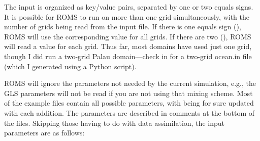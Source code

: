 The input is organized as key/value pairs, separated by one or two
equals signs. It is possible for ROMS to run on more than one grid
simultaneously, with the number of grids being read from the input
file. If there is one equals sign (\code{=}), ROMS will use the
corresponding value for all grids. If there are two (\code{==}), ROMS
will read a value for each grid. Thus far, most domains have used just
one grid, though I did run a two-grid Palau domain---check in
 for a two-grid ocean.in
file (which I generated using a Python script).

ROMS will ignore the parameters not needed by the current simulation,
e.g., the GLS parameters will not be read if you are not using that
mixing scheme. Most of the example files contain all possible
parameters, with  being for sure updated
with each addition. The parameters are described in comments at the
bottom of the  files. Skipping those having to do
with data assimilation, the input parameters are as follows:
